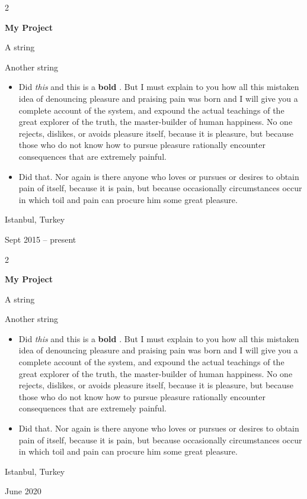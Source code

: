 \documentclass[10pt, letterpaper]{article}
\newenvironment{summary}{
    \begin{description}[
        topsep=0.10 cm,
        parsep=0.10 cm,
        partopsep=0pt,
        itemsep=0pt,
        leftmargin=0.4 cm + 10pt
    ]
}{
    \end{description}
} %
\newenvironment{highlights}{
    \begin{itemize}[
        topsep=0.10 cm,
        parsep=0.10 cm,
        partopsep=0pt,
        itemsep=0pt,
        leftmargin=0.4 cm + 10pt
    ]
}{
    \end{itemize}
} %
\newenvironment{twocolentry}[2][]{
    \onecolentry
    \def\secondColumn{#2}
    \setcolumnwidth{\fill, 4.5 cm}
    \begin{paracol}{2}
}{
    \switchcolumn \raggedleft \secondColumn
    \end{paracol}
    \endonecolentry
} %
\let\hrefWithoutArrow\href
\renewcommand{\href}[2]{\hrefWithoutArrow{#1}{\ifthenelse{\equal{#2}{}}{ }{#2 }\raisebox{.15ex}{\footnotesize \faExternalLink*}}}
\begin{document}
        \begin{twocolentry}{
            Istanbul, Turkey

        Sept 2015 – present
        }
            \textbf{My Project}
            \begin{summary}
                \item A string
                \item Another string
            \end{summary}
            \begin{highlights}
                \item Did \textit{this} and this is a \textbf{bold} \href{https://example.com}{link}. But I must explain to you how all this mistaken idea of denouncing pleasure and praising pain was born and I will give you a complete account of the system, and expound the actual teachings of the great explorer of the truth, the master-builder of human happiness. No one rejects, dislikes, or avoids pleasure itself, because it is pleasure, but because those who do not know how to pursue pleasure rationally encounter consequences that are extremely painful.
                \item Did that. Nor again is there anyone who loves or pursues or desires to obtain pain of itself, because it is pain, but because occasionally circumstances occur in which toil and pain can procure him some great pleasure.
            \end{highlights}
        \end{twocolentry}


        \vspace{0.2 cm}

        \begin{twocolentry}{
            Istanbul, Turkey

        June 2020
        }
            \textbf{My Project}
            \begin{summary}
                \item A string
                \item Another string
            \end{summary}
            \begin{highlights}
                \item Did \textit{this} and this is a \textbf{bold} \href{https://example.com}{link}. But I must explain to you how all this mistaken idea of denouncing pleasure and praising pain was born and I will give you a complete account of the system, and expound the actual teachings of the great explorer of the truth, the master-builder of human happiness. No one rejects, dislikes, or avoids pleasure itself, because it is pleasure, but because those who do not know how to pursue pleasure rationally encounter consequences that are extremely painful.
                \item Did that. Nor again is there anyone who loves or pursues or desires to obtain pain of itself, because it is pain, but because occasionally circumstances occur in which toil and pain can procure him some great pleasure.
            \end{highlights}
        \end{twocolentry}
\end{document}
